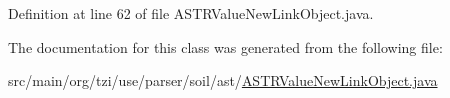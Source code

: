 Definition at line 62 of file A\-S\-T\-R\-Value\-New\-Link\-Object.\-java.



The documentation for this class was generated from the following file\-:\begin{DoxyCompactItemize}
\item 
src/main/org/tzi/use/parser/soil/ast/\hyperlink{_a_s_t_r_value_new_link_object_8java}{A\-S\-T\-R\-Value\-New\-Link\-Object.\-java}\end{DoxyCompactItemize}
